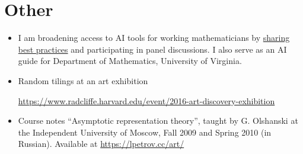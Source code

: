 \documentclass[letterpaper,11pt]{article}
\begin{document}
\section*{Other}

\begin{itemize}
	\item
	I am broadening access to AI tools for working mathematicians by \href{https://lpetrov.cc/AI-math/}{sharing} \href{https://storage.lpetrov.cc/research_files/talks/AI_UVA_Oct10.pdf}{best practices} and participating in panel discussions. I also serve as an AI guide for Department of Mathematics, University of Virginia.



	\item
	Random tilings at an art exhibition

	\url{https://www.radcliffe.harvard.edu/event/2016-art-discovery-exhibition}
	\item
	Course notes
	``Asymptotic representation theory'',
	taught by G. Olshanski
	at the Independent University of Moscow,
	Fall 2009 and Spring 2010 (in Russian).
	Available at \url{https://lpetrov.cc/art/}

\end{itemize}





\end{document}

